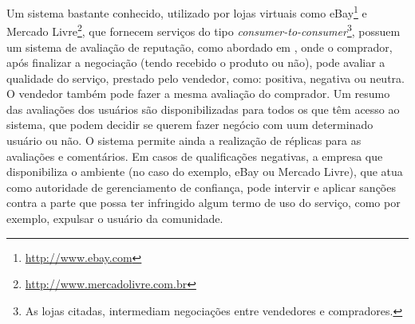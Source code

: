 Um sistema bastante conhecido, utilizado por lojas virtuais como eBay\footnote{\url{http://www.ebay.com}} e Mercado Livre\footnote{\url{http://www.mercadolivre.com.br}}, que fornecem serviços do tipo \textit{consumer-to-consumer}\footnote{As lojas citadas, intermediam negociações entre vendedores e compradores.}, possuem um sistema de avaliação de reputação, como abordado em \cite{wang2008reputation}, onde o comprador, após finalizar a negociação (tendo recebido o produto ou não), pode avaliar a qualidade do serviço, prestado pelo vendedor, como: positiva, negativa ou neutra. O vendedor também pode fazer a mesma avaliação do comprador. Um resumo das avaliações dos usuários são disponibilizadas para todos os que têm acesso ao sistema, que podem decidir se querem fazer negócio com uum determinado usuário ou não. O sistema permite ainda a realização de réplicas para as avaliações e comentários. Em casos de qualificações negativas, a empresa que disponibiliza o ambiente (no caso do exemplo, eBay ou Mercado Livre), que atua como autoridade de gerenciamento de confiança, pode intervir e aplicar sanções contra a parte que possa ter infringido algum termo de uso do serviço, como por exemplo, expulsar o usuário da comunidade.


